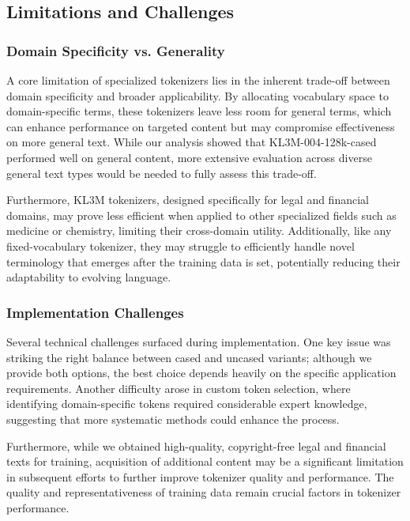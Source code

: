 \subsection{Limitations and Challenges}

\subsubsection{Domain Specificity vs. Generality}

A core limitation of specialized tokenizers lies in the inherent trade-off between domain specificity and broader applicability. By allocating vocabulary space to domain-specific terms, these tokenizers leave less room for general terms, which can enhance performance on targeted content but may compromise effectiveness on more general text. While our analysis showed that KL3M-004-128k-cased performed well on general content, more extensive evaluation across diverse general text types would be needed to fully assess this trade-off.

Furthermore, KL3M tokenizers, designed specifically for legal and financial domains, may prove less efficient when applied to other specialized fields such as medicine or chemistry, limiting their cross-domain utility. Additionally, like any fixed-vocabulary tokenizer, they may struggle to efficiently handle novel terminology that emerges after the training data is set, potentially reducing their adaptability to evolving language.

\subsubsection{Implementation Challenges}

Several technical challenges surfaced during implementation. One key issue was striking the right balance between cased and uncased variants; although we provide both options, the best choice depends heavily on the specific application requirements. Another difficulty arose in custom token selection, where identifying domain-specific tokens required considerable expert knowledge, suggesting that more systematic methods could enhance the process. 

Furthermore, while we obtained high-quality, copyright-free legal and financial texts for training, acquisition of additional content may be a significant limitation in subsequent efforts to further improve tokenizer quality and performance. The quality and representativeness of training data remain crucial factors in tokenizer performance.

